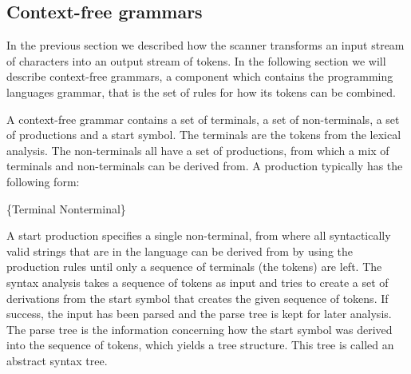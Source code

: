 \subsection{Context-free grammars}
\label{sec:context-freegrammars}
In the previous section we described how the scanner transforms an input stream of
characters into an output stream of tokens. In the following section we
will describe context-free grammars, a component which contains the programming
languages grammar, that is the set of rules for how its tokens can be
combined.

A context-free grammar contains a set of terminals, a set of non-terminals, a
set of productions and a start symbol. The terminals are the tokens from the
lexical analysis. The non-terminals all have a set of productions, from which a
mix of terminals and non-terminals can be derived from. A production typically
has the following form:

\begin{ebnf}
 {\{Terminal \gor \gcat Nonterminal\}}
\end{ebnf}

A start production specifies a single non-terminal, from where all syntactically
valid strings that are in the language can be derived from by using the
production rules until only a sequence of terminals (the tokens) are left. 
The syntax analysis takes a sequence of tokens as input and tries to create a
set of derivations from the start symbol that creates the given sequence of
tokens. If success, the input has been parsed and the parse tree is kept for
later analysis. The parse tree is the information concerning how the start
symbol was derived into the sequence of tokens, which yields a tree structure.
This tree is called an abstract syntax tree.

